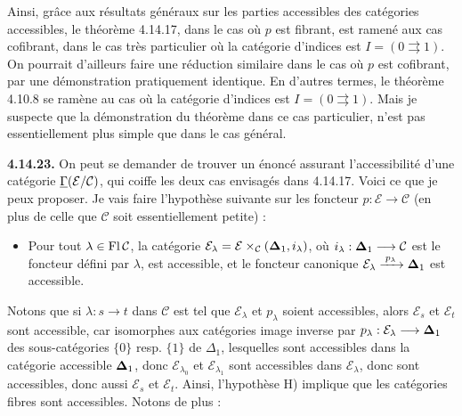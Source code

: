 Ainsi, grâce aux résultats généraux sur les parties accessibles des catégories accessibles, le théorème 4.14.17, dans le cas où $p$ est fibrant, est ramené aux cas cofibrant, dans le cas très particulier où la catégorie d'indices est $I=(0\rightrightarrows 1)$. On pourrait d'ailleurs faire une réduction similaire dans le cas où $p$ est cofibrant, par une démonstration pratiquement %
identique. En d'autres termes, le théorème 4.10.8 se ramène au cas où la catégorie d'indices est $I=(0\rightrightarrows 1)$. Mais je suspecte que la démonstration du théorème dans ce cas particulier, n'est pas essentiellement plus simple que dans le cas général.


\textbf{4.14.23.} On peut se demander de trouver un énoncé assurant l'accessibilité d'une catégorie $\underline{\Gamma}(\mathcal{E}/\mathcal{C})$, qui coiffe les deux cas envisagés dans 4.14.17. Voici ce que je peux proposer. Je vais faire l'hypothèse suivante sur les foncteur $p:\mathcal{E}\longrightarrow\mathcal{C}$ (en plus de celle que $\mathcal{C}$ soit essentiellement petite) : %

\begin{itemize}[leftmargin=*]
\item[H)] Pour tout $\lambda\in\operatorname{Fl}\mathcal{C}$, la catégorie $\mathcal{E}_\lambda=\mathcal{E}\times_{\mathcal{C}}(\boldsymbol{\Delta}_1,i_\lambda)$, où $i_\lambda:\boldsymbol{\Delta}_1\longrightarrow\mathcal{C}$ est le foncteur défini par $\lambda$, est accessible, et le foncteur canonique $\mathcal{E}_\lambda\xrightarrow{\;p_\lambda\;}\boldsymbol{\Delta}_1$ est accessible.
\end{itemize}

Notons que si $\lambda:s\longrightarrow t$ dans $\mathcal{C}$ est tel que $\mathcal{E}_\lambda$ et $p_\lambda$ soient accessibles, alors $\mathcal{E}_s$ et $\mathcal{E}_t$ sont accessible, car isomorphes aux catégories image inverse par $p_\lambda:\mathcal{E}_\lambda\longrightarrow\boldsymbol{\Delta}_1$ des sous-catégories $\{0\}$ resp. $\{1\}$ de $\Delta_1$, lesquelles sont accessibles dans la catégorie accessible $\boldsymbol{\Delta}_1$, donc %
$\mathcal{E}_{\lambda_0}$ et $\mathcal{E}_{\lambda_1}$ sont accessibles dans $\mathcal{E}_\lambda$, donc sont accessibles, donc aussi $\mathcal{E}_s$ et $\mathcal{E}_t$. Ainsi, l'hypothèse H) implique que les catégories fibres sont accessibles. Notons de plus :

